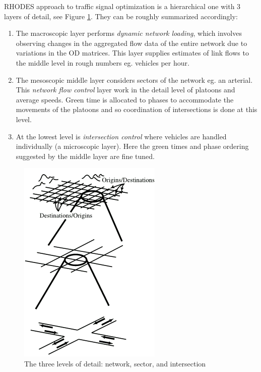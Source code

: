 \label{rhodes}
RHODES approach to traffic signal optimization is a hierarchical one with 3 layers of detail, see Figure \ref{fig:rhodes_hierarchi}. They can be roughly summarized accordingly:

\begin{enumerate}
\item The macroscopic layer performs \textit{dynamic network loading}, which involves observing changes in the aggregated flow data of the entire network due to variations in the OD matrices. This layer supplies estimates of link flows to the middle level in rough numbers eg. vehicles per hour.
\item The mesoscopic middle layer considers sectors of the network eg. an arterial. This \textit{network flow control} layer work in the detail level of platoons and average speeds. Green time is allocated to phases to accommodate the movements of the platoons and so coordination of intersections is done at this level.
\item At the lowest level is \textit{intersection control} where vehicles are handled individually (a microscopic layer). Here the green times and phase ordering suggested by the middle layer are fine tuned.
\end{enumerate}

\begin{figure}[!ht]
\begin{center}
\includegraphics[scale=0.5]{rhodes_hierachy.png} 
\end{center}
\caption{The three levels of detail: network, sector, and intersection}
\label{fig:rhodes_hierarchi}
\end{figure}

